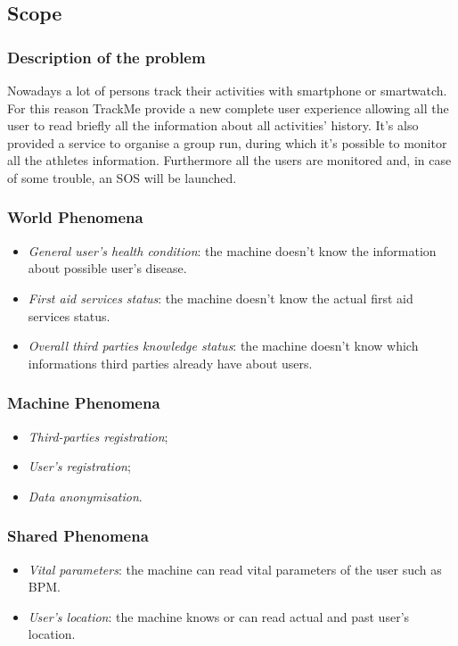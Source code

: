\documentclass{article}
\begin{document}
\newpage
\subsection{Scope}
\subsubsection{Description of the problem}
Nowadays a lot of persons track their activities with smartphone or
smartwatch. For this reason TrackMe provide a new complete user 
experience allowing all the user to read briefly all the information
about all activities’ history.
It’s also provided a service to organise a group run, during which
it’s possible to monitor all the athletes information.
Furthermore all the users are monitored and, in case of some trouble, 
an SOS will be launched.
\subsubsection{World Phenomena}
\begin{itemize}
	\item \textit{General user’s health condition}: the machine doesn’t know the information about possible user’s disease.
	\item \textit{First aid services status}: the machine doesn’t know the actual first aid services status.
	\item \textit{Overall third parties knowledge status}: the machine doesn’t know which informations third parties already have about users.
\end{itemize}

\subsubsection{Machine Phenomena}
\begin{itemize}
	\item \textit{Third-parties registration};
	\item \textit{User's registration};
	\item \textit{Data anonymisation}.
\end{itemize}

\subsubsection{Shared Phenomena}
\begin{itemize}
	\item \textit{Vital parameters}: the machine can read vital parameters of the user such as BPM.
	\item \textit{User's location}: the machine knows or can read actual and past user’s location.
\end{itemize}
\end{document}
